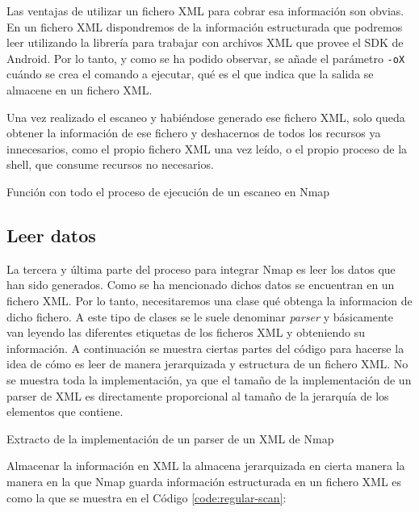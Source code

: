 Las ventajas de utilizar un fichero XML para cobrar esa información son obvias. En un fichero XML dispondremos de la información estructurada que podremos leer utilizando la librería para trabajar con archivos XML que provee el SDK de Android. Por lo tanto, y como se ha podido observar, se añade el parámetro \texttt{-oX} cuándo se crea el comando a ejecutar, qué es el que indica que la salida se almacene en un fichero XML.

Una vez realizado el escaneo y habiéndose generado ese fichero XML, solo queda obtener la información de ese fichero y deshacernos de todos los recursos ya innecesarios, como el propio fichero XML una vez leído, o el propio proceso de la shell, que consume recursos no necesarios.

\begin{listing}[H]
	\caption{Función con todo el proceso de ejecución de un escaneo en Nmap}
	
	\label{code:runScan}
\end{listing}

\subsection{Leer datos}

La tercera y última parte del proceso para integrar Nmap es leer los datos que han sido generados. Como se ha mencionado dichos datos se encuentran en un fichero XML. Por lo tanto, necesitaremos una clase qué obtenga la informacion de dicho fichero. A este tipo de clases se le suele denominar \textit{parser} y básicamente van leyendo las diferentes etiquetas de los ficheros XML y obteniendo su información. A continuación se muestra ciertas partes del código para hacerse la idea de cómo es leer de manera jerarquizada y estructura de un fichero XML. No se muestra toda la implementación, ya que el tamaño de la implementación de un parser de XML es directamente proporcional al tamaño de la jerarquía de los elementos que contiene.

\begin{listing}[H]
	\caption{Extracto de la implementación de un parser de un XML de Nmap}
	
	\label{code:nmapParser}
\end{listing}

Almacenar la información en XML la almacena jerarquizada en cierta manera la manera en la que Nmap guarda información estructurada en un fichero XML es como la que se muestra en el Código \ref{code:regular-scan}:

